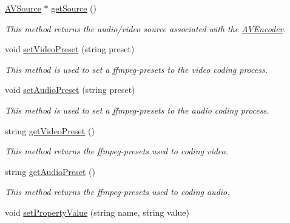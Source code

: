 \begin{DoxyCompactItemize}
\hyperlink{classbr_1_1ufscar_1_1lince_1_1streaming_1_1AVSource}{AVSource} $\ast$ \hyperlink{classbr_1_1ufscar_1_1lince_1_1streaming_1_1AVEncoder_adf111dba6e608b6e3ea20cee5252a6a6}{getSource} ()
\begin{DoxyCompactList}\small\item\em This method returns the audio/video source associated with the \hyperlink{classbr_1_1ufscar_1_1lince_1_1streaming_1_1AVEncoder}{AVEncoder}. \item\end{DoxyCompactList}\item 
void \hyperlink{classbr_1_1ufscar_1_1lince_1_1streaming_1_1AVEncoder_acabd65182bbb9d082a28030b79ac9bf1}{setVideoPreset} (string preset)
\begin{DoxyCompactList}\small\item\em This method is used to set a ffmpeg-\/presets to the video coding process. \item\end{DoxyCompactList}\item 
void \hyperlink{classbr_1_1ufscar_1_1lince_1_1streaming_1_1AVEncoder_a93c771242ed2751987f03f7606d81fed}{setAudioPreset} (string preset)
\begin{DoxyCompactList}\small\item\em This method is used to set a ffmpeg-\/presets to the audio coding process. \item\end{DoxyCompactList}\item 
string \hyperlink{classbr_1_1ufscar_1_1lince_1_1streaming_1_1AVEncoder_ae05f751735527750c3670cdb401e2180}{getVideoPreset} ()
\begin{DoxyCompactList}\small\item\em This method returns the ffmpeg-\/presets used to coding video. \item\end{DoxyCompactList}\item 
string \hyperlink{classbr_1_1ufscar_1_1lince_1_1streaming_1_1AVEncoder_a22c798c36bba4031f5d790b042f59d56}{getAudioPreset} ()
\begin{DoxyCompactList}\small\item\em This method returns the ffmpeg-\/presets used to coding audio. \item\end{DoxyCompactList}\item 
void \hyperlink{classbr_1_1ufscar_1_1lince_1_1streaming_1_1AVEncoder_a73a3b4824163ded2d49dc1e10f8b03d1}{setPropertyValue} (string name, string value)

\end{DoxyCompactItemize}
